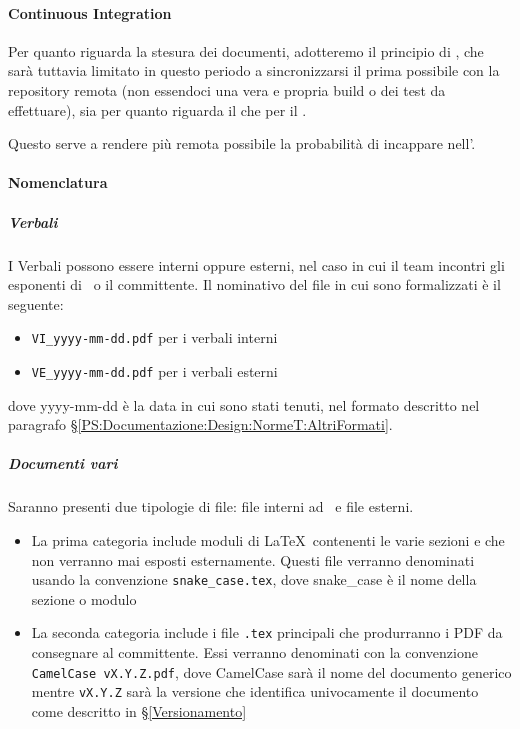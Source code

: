
			\paragraph{Continuous Integration} %
			Per quanto riguarda la stesura dei documenti, adotteremo il principio di , che sarà tuttavia limitato in questo periodo
			a sincronizzarsi il prima possibile con la repository remota (non essendoci
			una vera e propria build o dei test da effettuare), sia per quanto riguarda il  che per il .

			Questo serve a rendere più remota possibile la probabilità di incappare nell'.


			\paragraph{Nomenclatura}

			\subparagraph{Verbali}	\label{NomenclaturaVerbali}
			I Verbali  possono essere interni oppure esterni, nel caso in cui il team incontri gli esponenti di \II\ o il committente.
			Il nominativo del file in cui sono formalizzati è il seguente:
			\begin{itemize}
				\item \texttt{VI\_yyyy-mm-dd.pdf} per i verbali interni
				\item \texttt{VE\_yyyy-mm-dd.pdf} per i verbali esterni
			\end{itemize}
			dove yyyy-mm-dd è la data in cui sono stati tenuti, nel formato descritto nel paragrafo \S\ref{PS:Documentazione:Design:NormeT:AltriFormati}.

			\subparagraph{Documenti vari}
			Saranno presenti due tipologie di file: file interni ad \gruppo\ e file esterni.
			\begin{itemize}
				\item La prima categoria include moduli di \LaTeX\ contenenti le varie sezioni e che non verranno mai esposti esternamente. Questi file verranno
					denominati usando la convenzione \texttt{snake\_case.tex}, dove snake\_case è il nome della sezione o modulo
				\item La seconda categoria include i file \texttt{.tex} principali che produrranno i PDF da consegnare al committente. Essi verranno denominati
				con la convenzione \mbox{\texttt{CamelCase vX.Y.Z.pdf}}, dove CamelCase sarà il nome del documento generico mentre \texttt{vX.Y.Z}
				sarà la versione che identifica univocamente il documento come descritto in \S\ref{Versionamento}
			\end{itemize}
		
